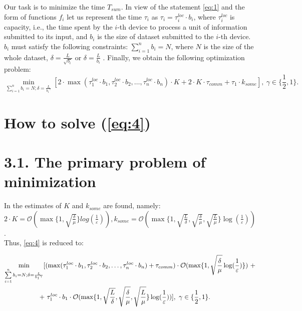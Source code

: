 \documentclass{article}
\theoremstyle{definition}
\theoremstyle{plain}
\begin{document}
Our task is to minimize the time $T_{sum}$. In view of the statement \eqref{eq:1} and the form of functions $f_i$ let us represent the time $\tau_i$ as $\tau_i = \tau_i^{loc}\cdot b_i$, where $\tau_i^{loc}$ is capacity, i.e., the time spent by the $i$-th device to process a unit of information submitted to its input, and $b_i$ is the size of dataset submitted to the $i$-th device. $b_i$ must satisfy the following constraints: $\sum\limits_{i = 1}^{n} b_i = N$, where $N$ is the size of the whole dataset, $\delta = \frac{L}{\sqrt{b_i}}$ or $\delta = \frac{L}{b_i}$ \cite{hendrikx2020statistically}.
Finally, we obtain the following optimization problem:
\begin{equation}
    \label{eq:4}
    \underset{\sum\limits_{i = 1}^{n} b_i = N; \delta = \frac{L}{{b_1}^{\gamma}}}{\min}[ 2\cdot\max(\tau_1^{loc}\cdot b_1, \tau_2^{loc}\cdot b_2, \ldots, \tau_n^{loc}\cdot b_n)\cdot K + 2\cdot K\cdot\tau_{comm} + \tau_1\cdot k_{some}], ~ \gamma \in \{\frac{1}{2}, 1\}.
\end{equation}

\section{How to solve (\ref{eq:4})}

\section*{3.1. The primary problem of minimization}
In \cite{kovalev2022optimal} the estimates of $K$ and $k_{some}$ are found, namely: \\ $2\cdot K = \mathcal O(\max\{1, \sqrt{\frac{\delta}{\mu}}\}log(\frac{1}{\varepsilon})), k_{some} = \mathcal O(\max\{1, \sqrt{\frac{L}{\delta}}, \sqrt{\frac{\delta}{\mu}}, \sqrt{\frac{L}{\mu}}\}\log(\frac{1}{\varepsilon}))$. \\

Thus, \eqref{eq:4} is reduced to:

\begin{eqnarray}
    \begin{split}
    \label{eq:5}
        \underset{\sum\limits_{i = 1}^{n} b_i = N; \delta = \frac{L}{{b_1}^\gamma}}{\min}[(\max(\tau_1^{loc}\cdot b_1, \tau_2^{loc}\cdot b_2, \ldots, \tau_n^{loc}\cdot b_n) + \tau_{comm}) \cdot \mathcal O(\max\{1, \sqrt{\frac{\delta}{\mu}}\log(\frac{1}{\varepsilon})\})  ~+
        \\ + ~
        \tau_1^{loc}\cdot b_1\cdot\mathcal O(\max\{1,\sqrt{\frac{L}{\delta}}, \sqrt{\frac{\delta}{\mu}}, \sqrt{\frac{L}{\mu}}\}\log(\frac{1}{\varepsilon}))] ,  ~ \gamma \in \{\frac{1}{2}, 1\}. \hspace{2.4cm}
    \end{split}
\end{eqnarray}
\end{document}
